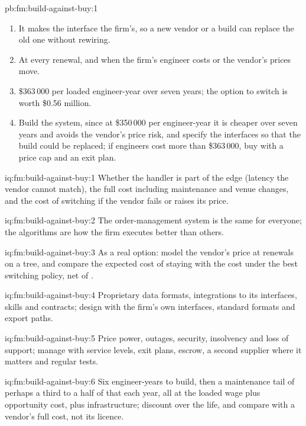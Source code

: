 \begin{solution}{pb:fm:build-against-buy:1}
\begin{enumerate}
\item It makes the interface the firm's, so a new vendor or a build can replace the old one without rewiring.
\item At every renewal, and when the firm's engineer costs or the vendor's prices move.
\item \$363\,000 per loaded engineer-year over seven years; the option to switch is worth \$0.56 million.
\item Build the system, since at \$350\,000 per engineer-year it is cheaper over seven years and avoids the vendor's price risk, and specify the
interfaces so that the build could be replaced; if engineers cost more than \$363\,000, buy with a price cap and an exit plan.
\end{enumerate}
\end{solution}

\begin{solution}{iq:fm:build-against-buy:1}
Whether the handler is part of the edge (latency the vendor cannot match), the full cost including maintenance and venue changes, and the cost of
switching if the vendor fails or raises its price.
\end{solution}

\begin{solution}{iq:fm:build-against-buy:2}
The order-management system is the same for everyone; the algorithms are how the firm executes better than others.
\end{solution}

\begin{solution}{iq:fm:build-against-buy:3}
As a real option: model the vendor's price at renewals on a tree, and compare the expected cost of staying with the cost under the best switching
policy, net of .
\end{solution}

\begin{solution}{iq:fm:build-against-buy:4}
Proprietary data formats, integrations to its interfaces, skills and contracts; design with the firm's own interfaces, standard formats and export
paths.
\end{solution}

\begin{solution}{iq:fm:build-against-buy:5}
Price power, outages, security, insolvency and loss of support; manage with service levels, exit plans, escrow, a second supplier where it matters
and regular tests.
\end{solution}

\begin{solution}{iq:fm:build-against-buy:6}
Six engineer-years to build, then a maintenance tail of perhaps a third to a half of that each year, all at the loaded wage plus opportunity cost,
plus infrastructure; discount over the life, and compare with a vendor's full cost, not its licence.
\end{solution}
